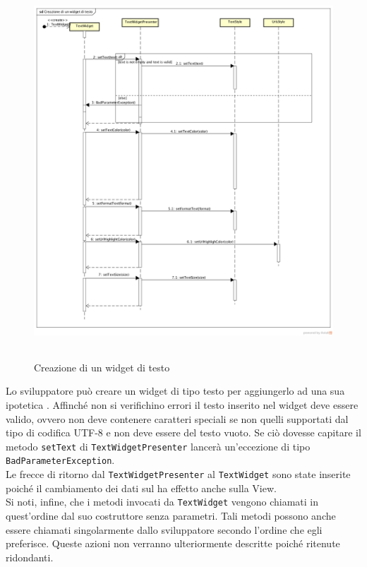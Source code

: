 \label{Creazione di un widget di testo}
\begin{figure}[H]
	\centering
	\includegraphics[width=16cm, height=14cm]{Sezioni/Diagrammi/SDK/Creazione di un widget di testo.png}
	\caption{Creazione di un widget di testo}
\end{figure}

Lo sviluppatore può creare un widget di tipo testo per aggiungerlo ad una sua ipotetica . Affinché non si verifichino errori il testo inserito nel widget deve essere valido, ovvero non deve contenere caratteri speciali se non quelli supportati dal tipo di codifica UTF-8 e non deve essere del testo vuoto. Se ciò dovesse capitare il metodo \texttt{setText} di \texttt{TextWidgetPresenter} lancerà un'eccezione di tipo \texttt{BadParameterException}. \\
Le frecce di ritorno dal \texttt{TextWidgetPresenter}  al \texttt{TextWidget} sono state inserite poiché il cambiamento dei dati sul  ha effetto anche sulla View. \\
Si noti, infine, che i metodi invocati da \texttt{TextWidget} vengono chiamati in quest'ordine dal suo costruttore senza parametri. Tali metodi possono anche essere chiamati singolarmente dallo sviluppatore secondo l'ordine che egli preferisce. Queste azioni non verranno ulteriormente descritte poiché ritenute ridondanti.

